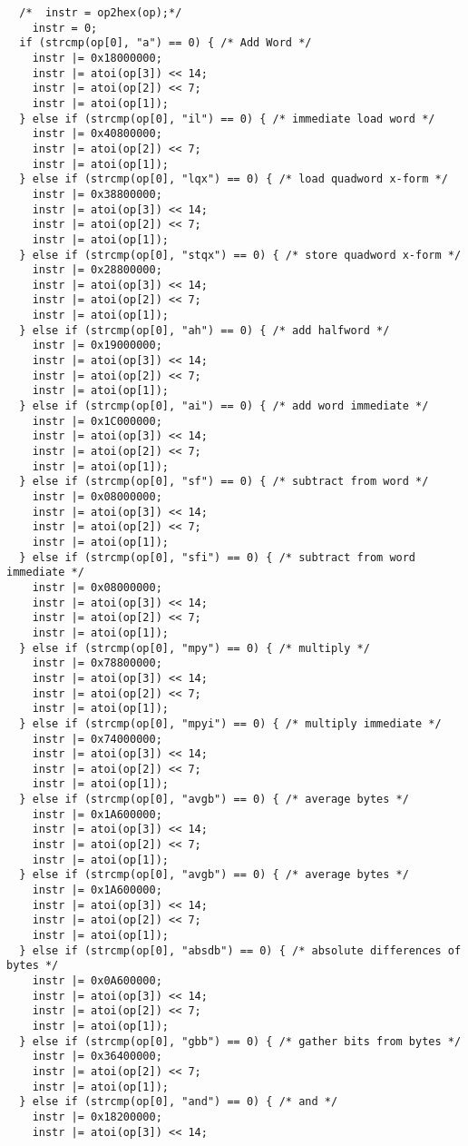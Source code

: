 \documentclass[preprint,authoryear,12pt]{elsarticle}
\begin{document}
\begin{verbatim}
  /*  instr = op2hex(op);*/
	instr = 0;
  if (strcmp(op[0], "a") == 0) { /* Add Word */
    instr |= 0x18000000;
    instr |= atoi(op[3]) << 14;
    instr |= atoi(op[2]) << 7;
    instr |= atoi(op[1]);
  } else if (strcmp(op[0], "il") == 0) { /* immediate load word */
    instr |= 0x40800000;
    instr |= atoi(op[2]) << 7;
    instr |= atoi(op[1]);
  } else if (strcmp(op[0], "lqx") == 0) { /* load quadword x-form */
    instr |= 0x38800000;
    instr |= atoi(op[3]) << 14;
    instr |= atoi(op[2]) << 7;
    instr |= atoi(op[1]);
  } else if (strcmp(op[0], "stqx") == 0) { /* store quadword x-form */
    instr |= 0x28800000;
    instr |= atoi(op[3]) << 14;
    instr |= atoi(op[2]) << 7;
    instr |= atoi(op[1]);
  } else if (strcmp(op[0], "ah") == 0) { /* add halfword */
    instr |= 0x19000000;
    instr |= atoi(op[3]) << 14;
    instr |= atoi(op[2]) << 7;
    instr |= atoi(op[1]);
  } else if (strcmp(op[0], "ai") == 0) { /* add word immediate */
    instr |= 0x1C000000;
    instr |= atoi(op[3]) << 14;
    instr |= atoi(op[2]) << 7;
    instr |= atoi(op[1]);
  } else if (strcmp(op[0], "sf") == 0) { /* subtract from word */
    instr |= 0x08000000;
    instr |= atoi(op[3]) << 14;
    instr |= atoi(op[2]) << 7;
    instr |= atoi(op[1]);
  } else if (strcmp(op[0], "sfi") == 0) { /* subtract from word immediate */
    instr |= 0x08000000;
    instr |= atoi(op[3]) << 14;
    instr |= atoi(op[2]) << 7;
    instr |= atoi(op[1]);
  } else if (strcmp(op[0], "mpy") == 0) { /* multiply */
    instr |= 0x78800000;
    instr |= atoi(op[3]) << 14;
    instr |= atoi(op[2]) << 7;
    instr |= atoi(op[1]);
  } else if (strcmp(op[0], "mpyi") == 0) { /* multiply immediate */
    instr |= 0x74000000;
    instr |= atoi(op[3]) << 14;
    instr |= atoi(op[2]) << 7;
    instr |= atoi(op[1]);
  } else if (strcmp(op[0], "avgb") == 0) { /* average bytes */
    instr |= 0x1A600000;
    instr |= atoi(op[3]) << 14;
    instr |= atoi(op[2]) << 7;
    instr |= atoi(op[1]);
  } else if (strcmp(op[0], "avgb") == 0) { /* average bytes */
    instr |= 0x1A600000;
    instr |= atoi(op[3]) << 14;
    instr |= atoi(op[2]) << 7;
    instr |= atoi(op[1]);
  } else if (strcmp(op[0], "absdb") == 0) { /* absolute differences of bytes */
    instr |= 0x0A600000;
    instr |= atoi(op[3]) << 14;
    instr |= atoi(op[2]) << 7;
    instr |= atoi(op[1]);
  } else if (strcmp(op[0], "gbb") == 0) { /* gather bits from bytes */
    instr |= 0x36400000;
    instr |= atoi(op[2]) << 7;
    instr |= atoi(op[1]);
  } else if (strcmp(op[0], "and") == 0) { /* and */
    instr |= 0x18200000;
    instr |= atoi(op[3]) << 14;

\end{verbatim}
\end{document}
